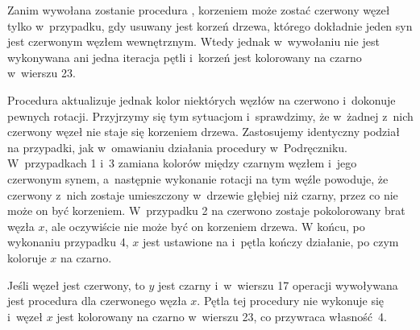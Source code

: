 \bignegskip

\exercise %
Zanim wywołana zostanie procedura , korzeniem może zostać czerwony węzeł tylko w~przypadku, gdy usuwany jest korzeń drzewa, którego dokładnie jeden syn jest czerwonym węzłem wewnętrznym.
Wtedy jednak w~wywołaniu  nie jest wykonywana ani jedna iteracja pętli  i~korzeń jest kolorowany na czarno w~wierszu 23.

Procedura  aktualizuje jednak kolor niektórych węzłów na czerwono i~dokonuje pewnych rotacji.
Przyjrzymy się tym sytuacjom i~sprawdzimy, że w~żadnej z~nich czerwony węzeł nie staje się korzeniem drzewa.
Zastosujemy identyczny podział na przypadki, jak w~omawianiu działania procedury w~Podręczniku.
W~przypadkach 1 i~3 zamiana kolorów między czarnym węzłem i~jego czerwonym synem, a~następnie wykonanie rotacji na tym węźle powoduje, że czerwony z~nich zostaje umieszczony w~drzewie głębiej niż czarny, przez co nie może on być korzeniem.
W~przypadku 2 na czerwono zostaje pokolorowany brat węzła $x$, ale oczywiście nie może być on korzeniem drzewa.
W końcu, po wykonaniu przypadku 4, $x$ jest ustawione na  i~pętla kończy działanie, po czym koloruje $x$ na czarno.

\exercise %
Jeśli węzeł  jest czerwony, to $y$ jest czarny i~w~wierszu 17 operacji  wywoływana jest procedura  dla czerwonego węzła $x$.
Pętla  tej procedury nie wykonuje się i~węzeł $x$ jest kolorowany na czarno w~wierszu 23, co przywraca własność~4.

